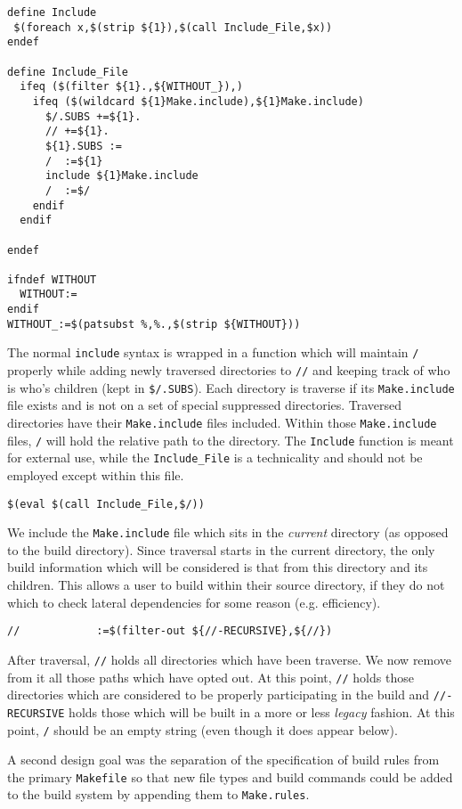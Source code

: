 \documentclass[letterpaper]{article}
\begin{document}
\begin{verbatim}
define Include
 $(foreach x,$(strip ${1}),$(call Include_File,$x))
endef

define Include_File
  ifeq ($(filter ${1}.,${WITHOUT_}),)
    ifeq ($(wildcard ${1}Make.include),${1}Make.include)
      $/.SUBS +=${1}.
      // +=${1}.
      ${1}.SUBS :=
      /  :=${1}
      include ${1}Make.include
      /  :=$/
    endif
  endif

endef

ifndef WITHOUT
  WITHOUT:=
endif
WITHOUT_:=$(patsubst %,%.,$(strip ${WITHOUT}))
\end{verbatim}
The normal \verb+include+ syntax is wrapped in a function which will
maintain \verb+/+ properly while adding newly traversed directories to
\verb+//+ and keeping track of who is who's children (kept in
\verb+$/.SUBS+).  Each directory
is traverse if its \verb+Make.include+ file exists and is not on
a set of special suppressed directories.  Traversed directories
have their \verb+Make.include+ files included.  Within those
\verb+Make.include+ files, \verb+/+ will hold the relative path
to the directory.  The \verb+Include+ function is meant for external
use, while the \verb+Include_File+ is a technicality and should not
be employed except within this file.

\begin{verbatim}
$(eval $(call Include_File,$/))
\end{verbatim}
We include the \verb+Make.include+ file which sits in the {\em current}
directory (as opposed to the build directory).  Since traversal
starts in the current directory, the only build information which
will be considered is that from this directory and its children.
This allows a user to build within their source directory, if they
do not which to check lateral dependencies for some reason (e.g.
efficiency).

\begin{verbatim}
//            :=$(filter-out ${//-RECURSIVE},${//})
\end{verbatim}
After traversal, \verb+//+ holds all directories which have been
traverse.  We now remove from it all those paths which have opted
out.  At this point, \verb+//+ holds those directories which are
considered to be properly participating in the build and
\verb+//-RECURSIVE+ holds those which will be built in a more or less
{\em legacy} fashion.  At this point, \verb+/+ should be an
empty string (even though it does appear below).

A second design goal was the separation of the specification of
build rules from the primary \verb+Makefile+ so that new file types
and build commands could be added to the build system by appending
them to \verb+Make.rules+.
\end{document}
